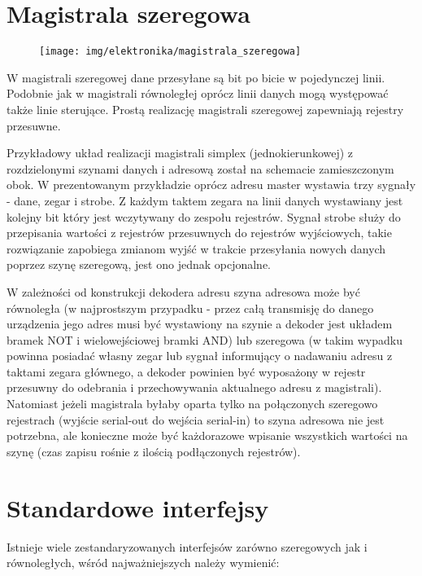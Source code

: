 \documentclass{pdfBooklets}
\begin{document}
\section{Magistrala szeregowa}

\begin{figure}\begin{center}
    \texttt{[image: img/elektronika/magistrala\_szeregowa]}
\end{center}\end{figure}
W magistrali szeregowej dane przesyłane są bit po bicie w pojedynczej linii. Podobnie jak w magistrali równoległej oprócz linii danych mogą występować także linie sterujące. Prostą realizację magistrali szeregowej zapewniają rejestry przesuwne.

Przykładowy układ realizacji magistrali simplex (jednokierunkowej) z rozdzielonymi szynami danych i adresową został na schemacie zamieszczonym obok.
W prezentowanym przykładzie oprócz adresu master wystawia trzy sygnały - dane, zegar i strobe. Z każdym taktem zegara na linii danych wystawiany jest kolejny bit który jest wczytywany do zespołu rejestrów. Sygnał strobe służy do przepisania wartości z rejestrów przesuwnych do rejestrów wyjściowych, takie rozwiązanie zapobiega zmianom wyjść w trakcie przesyłania nowych danych poprzez szynę szeregową, jest ono jednak opcjonalne.

W zależności od konstrukcji dekodera adresu szyna adresowa może być równoległa (w najprostszym przypadku - przez całą transmisję do danego urządzenia jego adres musi być wystawiony na szynie a dekoder jest układem bramek NOT i wielowejściowej bramki AND) lub szeregowa (w takim wypadku powinna posiadać własny zegar lub sygnał informujący o nadawaniu adresu z taktami zegara głównego, a dekoder powinien być wyposażony w rejestr przesuwny do odebrania i przechowywania aktualnego adresu z magistrali). Natomiast jeżeli magistrala byłaby oparta tylko na połączonych szeregowo rejestrach (wyjście serial-out do wejścia serial-in) to szyna adresowa nie jest potrzebna, ale konieczne może być każdorazowe wpisanie wszystkich wartości na szynę (czas zapisu rośnie z ilością podłączonych rejestrów).

\section{Standardowe interfejsy}

Istnieje wiele zestandaryzowanych interfejsów zarówno szeregowych jak i równoległych, wśród najważniejszych należy wymienić:
\end{document}
